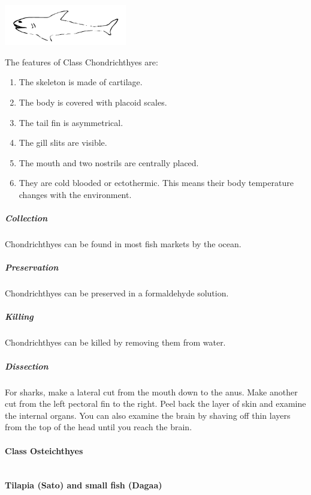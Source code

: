 \begin{multicols}{2}
\begin{center}
\includegraphics[width=0.4\textwidth]{./img/shark.png}
\end{center}

The features of Class Chondrichthyes are:
\begin{enumerate}
\item{The skeleton is made of cartilage.}
\item{The body is covered with placoid scales.}
\item{The tail fin is asymmetrical.}
\item{The gill slits are visible.}
\item{The mouth and two nostrils are centrally placed.}
\item{They are cold blooded or ectothermic. This means their body temperature changes with the environment.}
\end{enumerate}

\subparagraph{Collection}
Chondrichthyes can be found in most fish markets by the ocean. 

\subparagraph{Preservation} 
Chondrichthyes can be preserved in a formaldehyde solution.

\subparagraph{Killing}
Chondrichthyes can be killed by removing them from water. 

\subparagraph{Dissection}
For sharks, make a lateral cut from the mouth down to the anus. Make another cut from the left pectoral fin to the right. Peel back the layer of skin and examine the internal organs. You can also examine the brain by shaving off thin layers from the top of the head until you reach the brain.

%

\paragraph{Class Osteichthyes}\hfill \\
\textbf{Tilapia (Sato) and small fish (Dagaa)}


\end{multicols}
